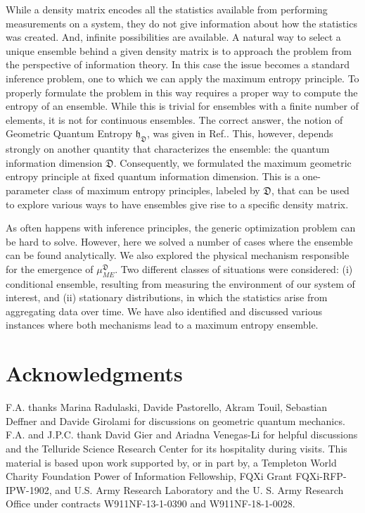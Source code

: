 \documentclass[draft,nofootinbib,pre,twocolumn,showpacs,showkeys,groupaddress,preprintnumbers,floatfix]{revtex4-1}
\newcommand{\1}{\mathbbm{1}}
\newcommand{\ID}{\mathfrak{D}}
\newcommand{\GE}{\mathfrak{h}_{\ID}}
\begin{document}
While a density matrix  encodes all the statistics available from performing
measurements on a system, they do not give information about how the statistics
was created. And, infinite possibilities are available. A natural way to select
a unique ensemble behind a given density matrix is to approach the problem from
the perspective of information theory. In this case the issue becomes a
standard inference problem, one to which we can apply the maximum entropy
principle. To properly formulate the problem in this way requires a proper way
to compute the entropy of an ensemble. While this is trivial for ensembles with
a finite number of elements, it is not for continuous ensembles. The correct
answer, the notion of Geometric Quantum Entropy $\GE$, was given in
Ref.\cite{Anza22a}. This, however, depends strongly on another quantity that
characterizes the ensemble: the quantum information dimension $\ID$.
Consequently, we formulated the maximum geometric entropy principle at fixed
quantum information dimension. This is a one-parameter class of maximum entropy
principles, labeled by $\ID$, that can be used to explore various ways to have
ensembles give rise to a specific density matrix.

As often happens with inference principles, the generic optimization problem
can be hard to solve. However, here we solved a number of cases where the
ensemble can be found analytically. We also explored the physical mechanism
responsible for the emergence of $\mu_{ME}^{\ID}$. Two different classes of
situations were considered: (i) conditional ensemble, resulting from measuring
the environment of our system of interest, and (ii) stationary distributions,
in which the statistics arise from aggregating data over time. We have also
identified and discussed various instances where both mechanisms lead to a
maximum entropy ensemble. 



\section*{Acknowledgments}
\label{sec:acknowledgments}

F.A. thanks Marina Radulaski, Davide Pastorello, Akram Touil, Sebastian Deffner
and Davide Girolami for discussions on geometric quantum mechanics. 
F.A. and J.P.C. thank David Gier and Ariadna Venegas-Li for helpful
discussions and the Telluride Science Research Center for its hospitality
during visits. This material is based upon work supported by, or in part by, a
Templeton World Charity Foundation Power of Information Fellowship, FQXi Grant
FQXi-RFP-IPW-1902, and U.S. Army Research Laboratory and the U. S. Army
Research Office under contracts W911NF-13-1-0390 and W911NF-18-1-0028.
\end{document}
